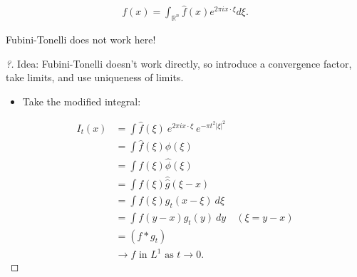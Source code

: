 \begin{theorem}

\begin{align*}
f(x)=\int_{\mathbb{R}^{n}} \widehat{f}(x) e^{2 \pi i x \cdot \xi} d \xi
.\end{align*}

\end{theorem}

\begin{warnings}

Fubini-Tonelli does not work here!

\end{warnings}

\begin{proof}[?]

Idea: Fubini-Tonelli doesn't work directly, so introduce a convergence
factor, take limits, and use uniqueness of limits.

\begin{itemize}
\tightlist
\item
  Take the modified integral:
\end{itemize}

\begin{align*}
I_{t}(x)
&= \int \widehat{f}(\xi) ~e^{2\pi i x \cdot \xi} ~e^{-\pi t^2 {\left\lvert {\xi} \right\rvert}^2} \\
&= \int \widehat{f}(\xi) \phi(\xi) \\
&= \int f(\xi) \widehat{\phi}(\xi) \\
&= \int f(\xi) \widehat{\widehat{g}}(\xi - x) \\
&= \int f(\xi) g_{t}(x - \xi)  ~d\xi \\
&= \int f(y-x) g_{t}(y) ~dy  \quad (\xi = y-x)\\
&= (f \ast g_{t}) \\
&\to f \text{ in $L^1$ as }t \to 0
.\end{align*}


\end{proof}
